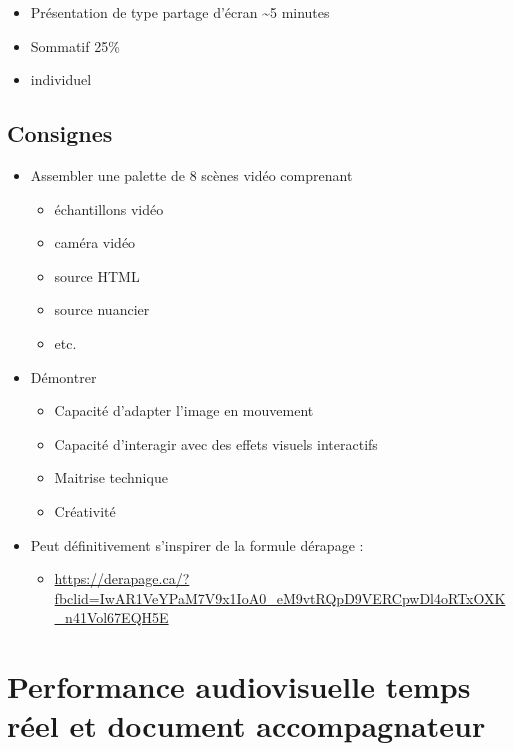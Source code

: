 \documentclass[
  french,
]{book}
\providecommand{\tightlist}{%
  \setlength{\itemsep}{0pt}\setlength{\parskip}{0pt}}
\begin{document}
\begin{itemize}
\tightlist
\item
  Présentation de type partage d'écran \textasciitilde5 minutes
\item
  Sommatif 25\%
\item
  individuel
\end{itemize}

\hypertarget{consignes-3}{%
\subsection{Consignes}\label{consignes-3}}

\begin{itemize}
\tightlist
\item
  Assembler une palette de 8 scènes vidéo comprenant

  \begin{itemize}
  \tightlist
  \item
    échantillons vidéo
  \item
    caméra vidéo
  \item
    source HTML
  \item
    source nuancier
  \item
    etc.
  \end{itemize}
\item
  Démontrer

  \begin{itemize}
  \tightlist
  \item
    Capacité d'adapter l'image en mouvement
  \item
    Capacité d'interagir avec des effets visuels interactifs
  \item
    Maitrise technique
  \item
    Créativité
  \end{itemize}
\item
  Peut définitivement s'inspirer de la formule dérapage :

  \begin{itemize}
  \tightlist
  \item
    \url{https://derapage.ca/?fbclid=IwAR1VeYPaM7V9x1IoA0_eM9vtRQpD9VERCpwDl4oRTxOXK_n41Vol67EQH5E}
  \end{itemize}
\end{itemize}

\hypertarget{sommatif_5}{%
\section{Performance audiovisuelle temps réel et document accompagnateur}\label{sommatif_5}}
\end{document}
